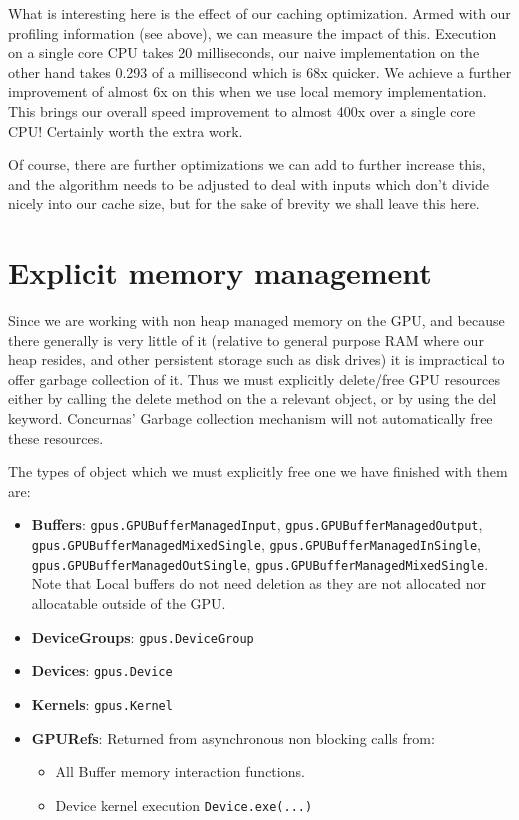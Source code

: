 \documentclass[conc-doc]{subfiles}
\begin{document}
What is interesting here is the effect of our caching optimization. Armed with our profiling information (see above), we can measure the impact of this. Execution on a single core CPU takes 20 milliseconds, our naive implementation on the other hand takes 0.293 of a millisecond which is 68x quicker. We achieve a further improvement of almost 6x on this when we use local memory implementation. This brings our overall speed improvement to almost 400x over a single core CPU! Certainly worth the extra work.

Of course, there are further optimizations we can add to further increase this, and the algorithm needs to be adjusted to deal with inputs which don't divide nicely into our cache size, but for the sake of brevity we shall leave this here.

\section{Explicit memory management}
Since we are working with non heap managed memory on the GPU, and because there generally is very little of it (relative to general purpose RAM where our heap resides, and other persistent storage such as disk drives) it is impractical to offer garbage collection of it. Thus we must explicitly delete/free GPU resources either by calling the delete method on the a relevant object, or by using the del keyword. Concurnas' Garbage collection mechanism will not automatically free these resources.

The types of object which we must explicitly free one we have finished with them are:
\begin{sloppypar}
	\begin{itemize}
		\item \textbf{Buffers}: \lstinline{gpus.GPUBufferManagedInput}, \lstinline{gpus.GPUBufferManagedOutput}, \lstinline{gpus.GPUBufferManagedMixedSingle}, \lstinline{gpus.GPUBufferManagedInSingle}, \lstinline{gpus.GPUBufferManagedOutSingle}, \lstinline{gpus.GPUBufferManagedMixedSingle}. Note that Local buffers do not need deletion as they are not allocated nor allocatable outside of the GPU.
		\item \textbf{DeviceGroups}: \lstinline{gpus.DeviceGroup}
		\item \textbf{Devices}: \lstinline{gpus.Device}
		\item \textbf{Kernels}: \lstinline{gpus.Kernel}
		\item \textbf{GPURefs}: Returned from asynchronous non blocking calls from: 
		\begin{itemize}
			\item All Buffer memory interaction functions.
			\item Device kernel execution \lstinline{Device.exe(...)}
		\end{itemize}
	\end{itemize}
\end{sloppypar}
\end{document}
